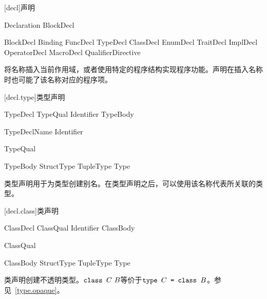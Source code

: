 
[decl]{声明}

\begin{bnf}{Declaration}
    BlockDecl
\end{bnf}

\begin{bnf}{BlockDecl}
    Binding \br
    FuncDecl \br
    TypeDecl \br
    ClassDecl \br
    EnumDecl \br
    TraitDecl \br
    ImplDecl \br
    OperatorDecl \br
    MacroDecl \br
    QualifierDirective
\end{bnf}

\pnum
{}将名称插入当前作用域，或者使用特定的程序结构实现程序功能。声明在插入名称时也可能了该名称对应的程序项。

[decl.type]{类型声明}

\begin{bnf}{TypeDecl}
    TypeQual\bnfs {} Identifier TypeBody
\end{bnf}

\begin{bnf}{TypeDeclName}
    Identifier \br
\end{bnf}

\begin{bnf}{TypeQual}
\end{bnf}

\begin{bnf}{TypeBody}
    StructType \br
    TupleType \br
    \terminal{=} Type
\end{bnf}

\pnum
类型声明用于为类型创建别名。在类型声明之后，可以使用该名称代表所关联的类型。

[decl.class]{类声明}

\begin{bnf}{ClassDecl}
    ClassQual\bnfs {} Identifier ClassBody
\end{bnf}

\begin{bnf}{ClassQual}
\end{bnf}

\begin{bnf}{ClassBody}
    StructType \br
    TupleType \br
    \terminal{=} Type
\end{bnf}

\pnum
类声明创建不透明类型。$\tcode{class }C\ B$等价于$\texttt{type }C\texttt{ = class }B$。参见~\ref{type.opaque}。

